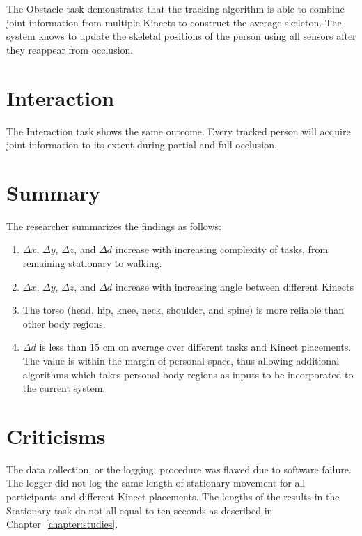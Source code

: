 The Obstacle task demonstrates that the tracking algorithm is able to combine joint information from multiple Kinects to construct the average skeleton. The system knows to update the skeletal positions of the person using all sensors after they reappear from occlusion.

\section{Interaction}
\label{sec:discussion_interaction}

The Interaction task shows the same outcome. Every tracked person will acquire joint information to its extent during partial and full occlusion.

\section{Summary}

The researcher summarizes the findings as follows:

\begin{enumerate}
  \item $\Delta x$, $\Delta y$, $\Delta z$, and $\Delta d$ increase with increasing complexity of tasks, from remaining stationary to walking.
  \item $\Delta x$, $\Delta y$, $\Delta z$, and $\Delta d$ increase with increasing angle between different Kinects
  \item The torso (head, hip, knee, neck, shoulder, and spine) is more reliable than other body regions.
  \item $\Delta d$ is less than $15$ cm on average over different tasks and Kinect placements. The value is within the margin of personal space, thus allowing additional algorithms which takes personal body regions as inputs to be incorporated to the current system.
\end{enumerate}

\section{Criticisms}
\label{sec:discussion_criticisms}

The data collection, or the logging, procedure was flawed due to software failure. The logger did not log the same length of stationary movement for all participants and different Kinect placements. The lengths of the results in the Stationary task do not all equal to ten seconds as described in Chapter~\ref{chapter:studies}.

